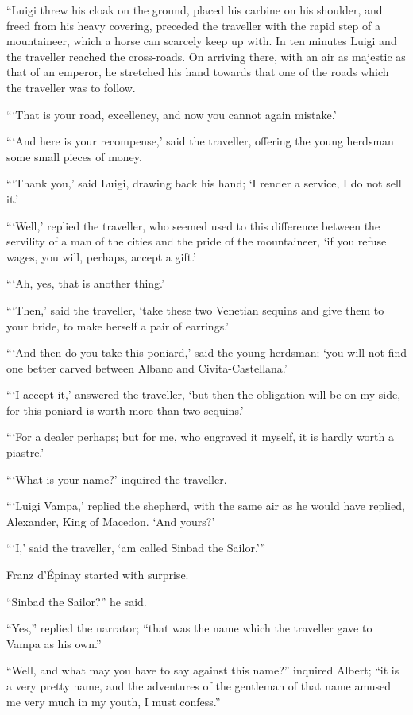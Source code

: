 “Luigi threw his cloak on the ground, placed his carbine on his
shoulder, and freed from his heavy covering, preceded the traveller
with the rapid step of a mountaineer, which a horse can scarcely keep
up with. In ten minutes Luigi and the traveller reached the
cross-roads. On arriving there, with an air as majestic as that of an
emperor, he stretched his hand towards that one of the roads which the
traveller was to follow.

“‘That is your road, excellency, and now you cannot again mistake.’

“‘And here is your recompense,’ said the traveller, offering the young
herdsman some small pieces of money.

“‘Thank you,’ said Luigi, drawing back his hand; ‘I render a service, I
do not sell it.’

“‘Well,’ replied the traveller, who seemed used to this difference
between the servility of a man of the cities and the pride of the
mountaineer, ‘if you refuse wages, you will, perhaps, accept a gift.’

“‘Ah, yes, that is another thing.’

“‘Then,’ said the traveller, ‘take these two Venetian sequins and give
them to your bride, to make herself a pair of earrings.’

“‘And then do you take this poniard,’ said the young herdsman; ‘you
will not find one better carved between Albano and Civita-Castellana.’

“‘I accept it,’ answered the traveller, ‘but then the obligation will
be on my side, for this poniard is worth more than two sequins.’

“‘For a dealer perhaps; but for me, who engraved it myself, it is
hardly worth a piastre.’

“‘What is your name?’ inquired the traveller.

“‘Luigi Vampa,’ replied the shepherd, with the same air as he would
have replied, Alexander, King of Macedon. ‘And yours?’

“‘I,’ said the traveller, ‘am called Sinbad the Sailor.’”

Franz d’Épinay started with surprise.

“Sinbad the Sailor?” he said.

“Yes,” replied the narrator; “that was the name which the traveller
gave to Vampa as his own.”

“Well, and what may you have to say against this name?” inquired
Albert; “it is a very pretty name, and the adventures of the gentleman
of that name amused me very much in my youth, I must confess.”

